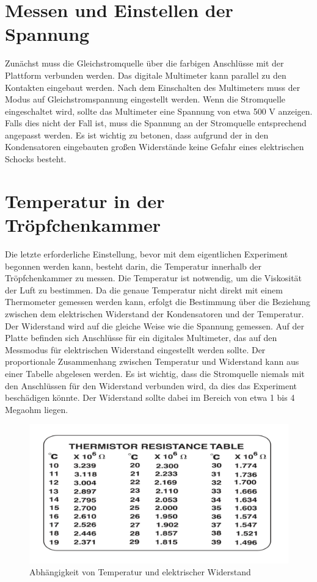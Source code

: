 \section{Messen und Einstellen der Spannung}\label{sec:spannung}
Zunächst muss die Gleichstromquelle über die farbigen Anschlüsse mit der Plattform verbunden werden. Das digitale Multimeter kann parallel zu den Kontakten eingebaut werden. Nach dem Einschalten des Multimeters muss der Modus auf Gleichstromspannung eingestellt werden. Wenn die Stromquelle eingeschaltet wird, sollte das Multimeter eine Spannung von etwa 500 V anzeigen. Falls dies nicht der Fall ist, muss die Spannung an der Stromquelle entsprechend angepasst werden. Es ist wichtig zu betonen, dass aufgrund der in den Kondensatoren eingebauten großen Widerstände keine Gefahr eines elektrischen Schocks besteht.

\section{Temperatur in der Tröpfchenkammer}\label{sec:Temperatur}
Die letzte erforderliche Einstellung, bevor mit dem eigentlichen Experiment begonnen werden kann, besteht darin, die Temperatur innerhalb der Tröpfchenkammer zu messen. Die Temperatur ist notwendig, um die Viskosität der Luft zu bestimmen. Da die genaue Temperatur nicht direkt mit einem Thermometer gemessen werden kann, erfolgt die Bestimmung über die Beziehung zwischen dem elektrischen Widerstand der Kondensatoren und der Temperatur. Der Widerstand wird auf die gleiche Weise wie die Spannung gemessen. Auf der Platte befinden sich Anschlüsse für ein digitales Multimeter, das auf den Messmodus für elektrischen Widerstand eingestellt werden sollte. Der proportionale Zusammenhang zwischen Temperatur und Widerstand kann aus einer Tabelle abgelesen werden. Es ist wichtig, dass die Stromquelle niemals mit den Anschlüssen für den Widerstand verbunden wird, da dies das Experiment beschädigen könnte. Der Widerstand sollte dabei im Bereich von etwa 1 bis 4 Megaohm liegen.

\begin{figure}[ht]
	\begin{center}
		\includegraphics[scale=0.25]{bilder/pdf/TemperaturTabelle.pdf}
		\caption{Abhängigkeit von Temperatur und elektrischer Widerstand \parencite[24]{instructionManual}}
		\label{fig:widerstandTemperatur}
	\end{center}
\end{figure}

